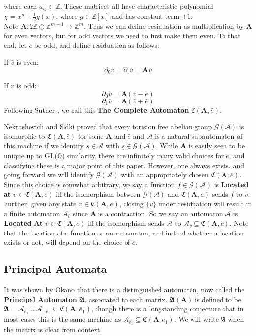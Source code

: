 \documentclass[runningheads]{llncs}
\newcommand{\A}{\mathcal{A}}
\newcommand{\G}{\mathcal{G}}
\renewcommand{\P}{\mathfrak{A}}
\newcommand{\C}{\mathfrak{C}(\Am,\e)}
\newcommand{\Z}{\mathbb{Z}}
\newcommand{\Q}{\mathbb{Q}}
\newcommand{\2}{\textbf{2}}
\newcommand{\Am}{\textbf{A}}
\newcommand{\del}{\partial}
\renewcommand{\v}{\bar{v}}
\newcommand{\e}{\bar{e}}
\begin{document}
where each $a_{ij} \in \Z$. These matrices all have characteristic polynomial
$\chi = x^n + \frac{1}{2}g(x)$, where $g \in \Z[x]$ and has constant term 
$\pm 1$.\\ 
Note $\Am : 2\Z \oplus \Z^{m-1} \to \Z^m$.
Thus we can define residuation as multiplication by $\Am$ for even vectors,
but for odd vectors we need to first make them even. To that end, let $\e$
be odd, and define residuation as follows:

If $\v$ is even:
\[ \del_0 \v = \del_1 \v = \Am \v \]

If $\v$ is odd:
\[ \del_0 \v = \Am (\v - \e) \]
\[ \del_1 \v = \Am (\v + \e) \]
Following Sutner \cite{Sutner18:abelian_automata}, we call this 
\textbf{The Complete Automaton} $\C$. 

Nekrashevich and Sidki proved that every torision free abelian 
group $\G(\A)$ is isomorphic to $\C$ for some $\Am$ and $\e$ 
\cite{NekrashevychSidki04:automorphisms} and $\A$ is a natural 
subautomaton of this machine if we identify $s \in \A$ with 
$\underline{s} \in \G(\A)$. While $\Am$ is easily seen to be unique
up to GL($\Q$) similarity, there are infinitely many valid choices for
$\e$, and classifying these is a major point of this paper. However, one
always exists, and going forward we will identify $\G(\A)$ with an 
appropriately chosen $\C$. Since this choice is somwhat arbitrary,
we say a function $f \in \G(\A)$ is \textbf{Located at} $\v \in \C$ iff
the isomorphism between $\G(\A)$ and $\C$ sends $f$ to $\v$. 
Further, given any state $\v \in \C$, closing $\{ \v \}$ under residuation 
will result in a finite automaton $\A_{\v}$ since $\Am$ is a contraction.
So we say an automaton $\A$ is \textbf{Located At} $\v \in \C$ iff the
isomorphism sends $\A$ to $\A_{\v} \subseteq \C$. Note that the location of a 
function or an automaton, and indeed whether a location exists or not, will 
depend on the choice of $\e$.

\subsection{Principal Automata}
It was shown by Okano \cite{Okano15:thesis} that there is a 
distinguished automaton, now called the \textbf{Principal Automaton} $\P$, 
associated to each matrix. $\P(\Am)$ is defined to be 
$\P = \A_{\e_1} \cup \A_{-\e_1} \subseteq \mathfrak{C}(\Am, \e_1)$,
though there is a longstanding conjecture that in most cases this is
the same machine as $\A_{\e_1} \subseteq \mathfrak{C}(\Am, \e_1)$.
We will write $\P$ when the matrix is clear from context. 
\end{document}
